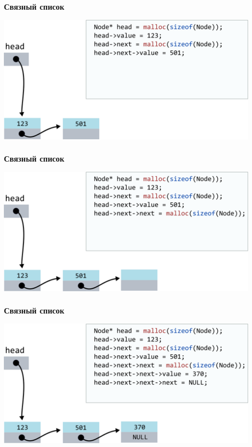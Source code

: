 \documentclass[10pt,pdf,hyperref={unicode}]{beamer}
\begin{document}
\begin{frame}[fragile]
\frametitle{Связный список}
\begin{center}
\includegraphics[width=\imageSizeMult\linewidth]{../images/codelist/codelist5.png}
\end{center}
\end{frame}


\begin{frame}[fragile]
\frametitle{Связный список}
\begin{center}
\includegraphics[width=\imageSizeMult\linewidth]{../images/codelist/codelist6.png}
\end{center}
\end{frame}


\begin{frame}[fragile]
\frametitle{Связный список}
\begin{center}
\includegraphics[width=\imageSizeMult\linewidth]{../images/codelist/codelist7.png}
\end{center}
\end{frame}
\end{document}
